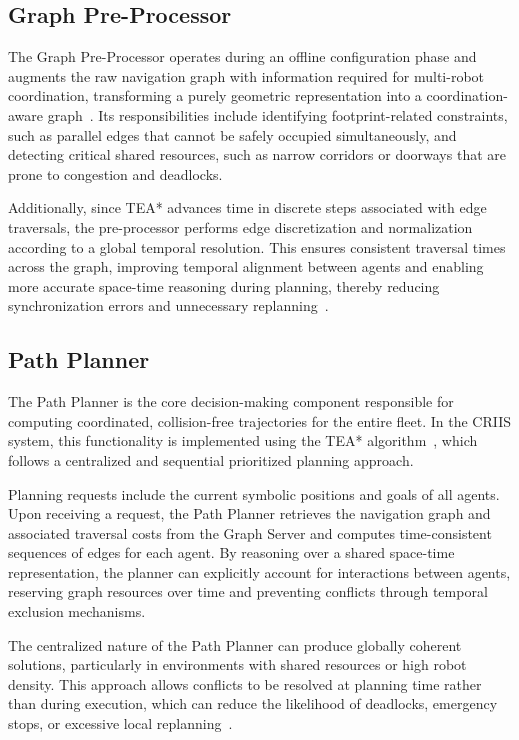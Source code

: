 \subsection{Graph Pre-Processor}
\label{subsec:graph_pre_processor}
\hspace{\parindent}
The Graph Pre-Processor operates during an offline configuration phase and augments the raw
navigation graph with information required for multi-robot coordination, transforming a purely
geometric representation into a coordination-aware graph~\cite{matos2025criis}. Its responsibilities
include identifying footprint-related constraints, such as parallel edges that cannot be safely
occupied simultaneously, and detecting critical shared resources, such as narrow corridors or
doorways that are prone to congestion and deadlocks.

Additionally, since TEA* advances time in discrete steps associated with edge traversals, the
pre-processor performs edge discretization and normalization according to a global temporal
resolution. This ensures consistent traversal times across the graph, improving temporal alignment
between agents and enabling more accurate space-time reasoning during planning, thereby reducing
synchronization errors and unnecessary replanning~\cite{filipe_decomposition}.

\subsection{Path Planner}
\label{subsec:path_planner}
\hspace{\parindent}
The Path Planner is the core decision-making component responsible for computing coordinated,
collision-free trajectories for the entire fleet. In the CRIIS system, this functionality is
implemented using the TEA* algorithm~\cite{matos2025criis}, which follows a centralized and
sequential prioritized planning approach.

Planning requests include the current symbolic positions and goals of all agents. Upon
receiving a request, the Path Planner retrieves the navigation graph and associated traversal costs
from the Graph Server and computes time-consistent sequences of edges for each agent. By reasoning
over a shared space-time representation, the planner can explicitly account for interactions between
agents, reserving graph resources over time and preventing conflicts through temporal exclusion
mechanisms.

The centralized nature of the Path Planner can produce globally coherent solutions, particularly in
environments with shared resources or high robot density. This approach allows conflicts to be
resolved at planning time rather than during execution, which can reduce the likelihood of deadlocks,
emergency stops, or excessive local replanning~\cite{matos2025criis}.

